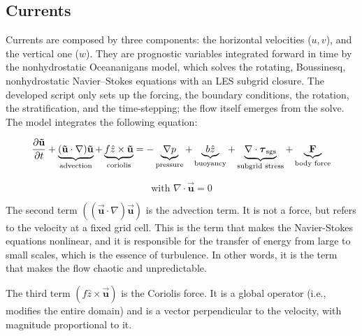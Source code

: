 \subsection{Currents}

Currents are composed by three components: the horizontal velocities ($u,v$),
and the vertical one ($w$). They are prognostic variables integrated 
forward in time by the nonhydrostatic Oceananigans model, which solves the rotating, 
Boussinesq, nonhydrostatic Navier–Stokes equations with an LES subgrid closure. 
The developed script only sets up the forcing, the boundary conditions, the rotation, 
the stratification, and the time-stepping; the flow itself emerges from the solve.
The model integrates the following equation:

\begin{equation}
\frac{\partial \mathbf{\vec{u}}}{\partial t} + \underbrace{(\mathbf{\vec{u}}\cdot\nabla)\mathbf{\vec{u}}}_{\text{advection}} + \underbrace{f \hat{z}\times\mathbf{\vec{u}}}_{\text{coriolis}} = -\underbrace{\nabla p}_{\text{pressure}} + \underbrace{b \hat{z}}_{\text{buoyancy}} + \underbrace{\nabla\cdot\boldsymbol{\tau}_{\rm sgs}}_{\text{subgrid stress}} + \underbrace{\mathbf{F}}_{\text{body force}}
\end{equation}

\begin{equation*}
    \text{with } \nabla\cdot\mathbf{\vec{u}} = 0
\end{equation*}

The second term $((\mathbf{\vec{u}}\cdot\nabla)\mathbf{\vec{u}})$ is the advection term. It is not a force, but refers to the velocity at a fixed grid cell. 
This is the term that makes the Navier-Stokes equations nonlinear, and it is responsible for the transfer of energy from large to small scales, which is the essence of turbulence. 
In other words, it is the term that makes the flow chaotic and unpredictable.

The third term $(f \hat{z}\times\mathbf{\vec{u}})$ is the Coriolis force. It is a global operator (i.e., modifies the entire domain) and is a vector perpendicular to the velocity, with magnitude proportional to it.

